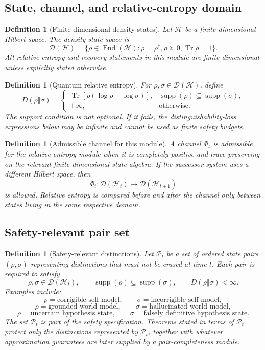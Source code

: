 \documentclass[11pt]{article}
\newtheorem{definition}[theorem]{Definition}
\newcommand{\D}{\mathcal{D}}
\newcommand{\Hcal}{\mathcal{H}}
\newcommand{\Pcal}{\mathcal{P}}
\newcommand{\Tr}{\operatorname{Tr}}
\newcommand{\supp}{\operatorname{supp}}
\newcommand{\1}{\mathbf{1}}
\begin{document}
\subsection{State, channel, and relative-entropy domain}

\begin{definition}[Finite-dimensional density states]
Let \(\Hcal\) be a finite-dimensional Hilbert space.  The density-state space is
\[
\D(\Hcal)
=
\{\rho\in\operatorname{End}(\Hcal):\rho=\rho^\dagger,\rho\succeq0,\Tr\rho=1\}.
\]
All relative-entropy and recovery statements in this module are finite-dimensional unless explicitly stated otherwise.
\end{definition}

\begin{definition}[Quantum relative entropy]
For \(\rho,\sigma\in\D(\Hcal)\), define
\[
D(\rho\Vert\sigma)
=
\begin{cases}
\Tr[\rho(\log\rho-\log\sigma)],&\supp(\rho)\subseteq\supp(\sigma),\\
+\infty,&\text{otherwise.}
\end{cases}
\]
The support condition is not optional.  If it fails, the distinguishability-loss expressions below may be infinite and cannot be used as finite safety budgets.
\end{definition}

\begin{definition}[Admissible channel for this module]
A channel \(\Phi_t\) is admissible for the relative-entropy module when it is completely positive and trace preserving on the relevant finite-dimensional state algebra.  If the successor system uses a different Hilbert space, then
\[
\Phi_t:\D(\Hcal_t)\to\D(\Hcal_{t+1})
\]
is allowed.  Relative entropy is compared before and after the channel only between states living in the same respective domain.
\end{definition}

\subsection{Safety-relevant pair set}

\begin{definition}[Safety-relevant distinctions]
Let \(\Pcal_t\) be a set of ordered state pairs \((\rho,\sigma)\) representing distinctions that must not be erased at time \(t\).  Each pair is required to satisfy
\[
\rho,\sigma\in\D(\Hcal_t),
\qquad
\supp(\rho)\subseteq\supp(\sigma),
\qquad
D(\rho\Vert\sigma)<\infty.
\]
Examples include:
\[
\rho=\text{corrigible self-model},
\qquad
\sigma=\text{incorrigible self-model},
\]
\[
\rho=\text{grounded world-model},
\qquad
\sigma=\text{hallucinated world-model},
\]
\[
\rho=\text{uncertain hypothesis state},
\qquad
\sigma=\text{falsely definitive hypothesis state}.
\]
The set \(\Pcal_t\) is part of the safety specification.  Theorems stated in terms of \(\Pcal_t\) protect only the distinctions represented by \(\Pcal_t\), together with whatever approximation guarantees are later supplied by a pair-completeness module.
\end{definition}
\end{document}
